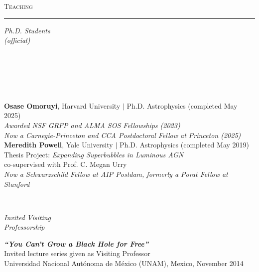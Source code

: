 \documentclass[11pt]{article}
\makeatletter
\def\vhrulefill#1{\leavevmode\leaders\hrule\@height#1\hfill \kern\z@}
\makeatother
\begin{document}
\vspace{2mm}


\clearpage



\textsc{Teaching} \vhrulefill{0.4pt}

\vspace{6mm}


\hspace{2.5mm} \parbox{1.5in}{\textit{Ph.D. Students \\ (official) \\\\\\\\\\\\}} \parbox{5.15in}{


\textbf{Osase Omoruyi}, Harvard University $|$ Ph.D. Astrophysics (completed May 2025)\\
 \textit{Awarded NSF GRFP and ALMA SOS Fellowships (2023) \\
\textit{Now a Carnegie-Princeton and CCA Postdoctoral Fellow at Princeton (2025)}}
\\

\textbf{Meredith Powell}, Yale University $|$ Ph.D. Astrophysics (completed May 2019)\\ Thesis Project: \textit{Expanding Superbubbles in Luminous AGN}\\
co-supervised with Prof. C. Megan Urry\\
\textit{Now a Schwarzschild Fellow at AIP Postdam, formerly a Porat Fellow at Stanford}
}\\


\vspace{4mm}



\hspace{2.5mm} \parbox{1.5in}{\textit{Invited Visiting \\ Professorship \\ }} \parbox{5.15in}{ \textit{\textbf{``You Can't Grow a Black Hole for Free''}}\\ Invited lecture series given as Visiting Professor \\ Universidad Nacional Aut\'{o}noma de M\'{e}xico (UNAM), Mexico, November 2014}\\



\vspace{4mm}
\end{document}
